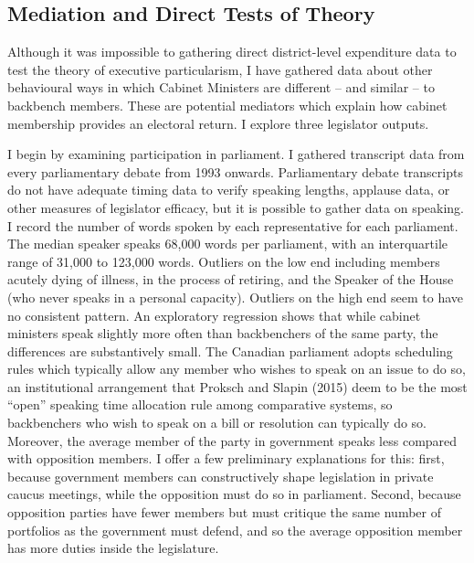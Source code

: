 \documentclass[letter,12pt]{article}
\begin{document}

\pagebreak

\subsection*{Mediation and Direct Tests of Theory}

Although it was impossible to gathering direct district-level expenditure data to test the theory of executive particularism, I have gathered data about other behavioural ways in which Cabinet Ministers are different -- and similar -- to backbench members. These are potential mediators which explain how cabinet membership provides an electoral return. I explore three legislator outputs. 

I begin by examining participation in parliament. I gathered transcript data from every parliamentary debate from 1993 onwards. Parliamentary debate transcripts do not have adequate timing data to verify speaking lengths, applause data, or other measures of legislator efficacy, but it is possible to gather data on speaking. I record the number of words spoken by each representative for each parliament. The median speaker speaks 68,000 words per parliament, with an interquartile range of 31,000 to 123,000 words. Outliers on the low end including members acutely dying of illness, in the process of retiring, and the Speaker of the House (who never speaks in a personal capacity). Outliers on the high end seem to have no consistent pattern. An exploratory regression shows that while cabinet ministers speak slightly more often than backbenchers of the same party, the differences are substantively small. The Canadian parliament adopts scheduling rules which typically allow any member who wishes to speak on an issue to do so, an institutional arrangement that Proksch and Slapin (2015) deem to be the most ``open'' speaking time allocation rule among comparative systems, so backbenchers who wish to speak on a bill or resolution can typically do so. Moreover, the average member of the party in government speaks less compared with opposition members. I offer a few preliminary explanations for this: first, because government members can constructively shape legislation in private caucus meetings, while the opposition must do so in parliament. Second, because opposition parties have fewer members but must critique the same number of portfolios as the government must defend, and so the average opposition member has more duties inside the legislature. 
\end{document}
